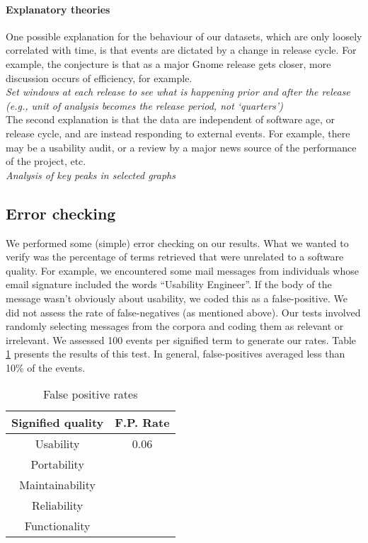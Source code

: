 \documentclass[conference, compsoc]{IEEEtran}
\begin{document}
\paragraph{Explanatory theories}
One possible explanation for the behaviour of our datasets, which are only loosely correlated with time, is that events are dictated by a change in release cycle. For example, the conjecture is that as a major Gnome release gets closer, more discussion occurs of efficiency, for example. \\
\emph{Set windows at each release to see what is happening prior and after the release (e.g., unit of analysis becomes the release period, not `quarters')\\
}
The second explanation is that the data are independent of software age, or release cycle, and are instead responding to external events. For example, there may be a usability audit, or a review by a major news source of the performance of the project, etc. \\
\emph{Analysis of key peaks in selected graphs}
\subsection{Error checking}
We performed some (simple) error checking on our results. What we wanted to verify was the percentage of terms retrieved that were unrelated to a software quality. For example, we encountered some mail messages from individuals whose email signature included the words ``Usability Engineer''. If the body of the message wasn't obviously about usability, we coded this as a false-positive. We did not assess the rate of false-negatives (as mentioned above). Our tests involved randomly selecting messages from the corpora and coding them as relevant or irrelevant. We assessed 100 events per signified term to generate our rates. Table \ref{tbl:error} presents the results of this test. In general, false-positives averaged less than 10\% of the events.

\begin{table}
	\caption{False positive rates}
	\centering
	\label{tbl:error}
\begin{tabular}{|c|c|}
\hline
Signified quality & F.P. Rate  \\
\hline
\hline
Usability & 0.06\\ \hline
Portability & \\ \hline
Maintainability & \\ \hline
Reliability & \\ \hline
Functionality & \\ \hline
\hline
\end{tabular}
\end{table}
\end{document}
